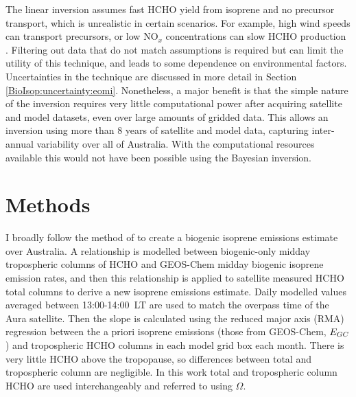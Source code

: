       
      
      The linear inversion assumes fast HCHO yield from isoprene and no precursor transport, which is unrealistic in certain scenarios.
      For example, high wind speeds can transport precursors, or low NO$_x$ concentrations can slow HCHO production \parencite{Palmer2006,Surl2018}.
      Filtering out data that do not match assumptions is required but can limit the utility of this technique, and leads to some dependence on environmental factors.
      Uncertainties in the technique are discussed in more detail in Section \ref{BioIsop:uncertainty:eomi}.
      Nonetheless, a major benefit is that the simple nature of the inversion requires very little computational power after acquiring satellite and model datasets, even over large amounts of gridded data.
      This allows an inversion using more than 8 years of satellite and model data, capturing inter-annual variability over all of Australia.
      With the computational resources available this would not have been possible using the Bayesian inversion.

\section{Methods}
  \label{BioIsop:method}
  
  
  I broadly follow the method of \textcite{Palmer2001} to create a biogenic isoprene emissions estimate over Australia.
  A relationship is modelled between biogenic-only midday tropospheric columns of HCHO and GEOS-Chem midday biogenic isoprene emission rates, and then this relationship is applied to satellite measured HCHO total columns to derive a new isoprene emissions estimate.
  Daily modelled values averaged between 13:00-14:00~LT are used to match the overpass time of the Aura satellite.
  Then the slope is calculated using the reduced major axis (RMA) regression between the a priori isoprene emissions (those from GEOS-Chem, $E_{GC}$) and tropospheric HCHO columns in each model grid box each month.
  There is very little HCHO above the tropopause, so differences between total and tropospheric column are negligible.
  In this work total and tropospheric column HCHO are used interchangeably and referred to using $\Omega$.
  
  
